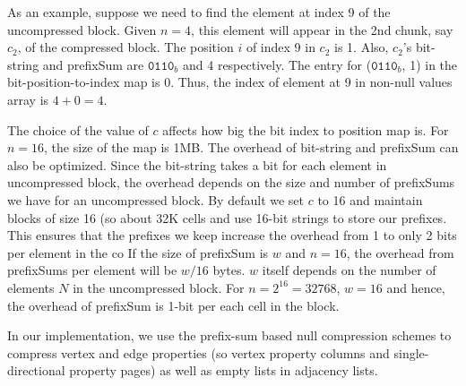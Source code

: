 As an example, suppose we need to find the element at index 9 of the uncompressed block. Given $n=4$, this element will appear in the 2nd chunk, say $c_2$, of the compressed block. The position $i$ of index 9 in $c_2$ is 1. Also, $c_2$'s bit-string and prefixSum are $\texttt{0110}_b$ and 4 respectively. The entry for ($\texttt{0110}_b$, 1) in the bit-position-to-index map is 0. Thus, the index of element at 9 in non-null values array is $4+0 = 4$.

The choice of the value of $c$ affects how big the bit index to position map is. For $n = 16$, the size of the map is 1MB. The overhead of bit-string and prefixSum can also be optimized. Since the bit-string takes a bit for each element in uncompressed block, the overhead depends on the size and number of prefixSums we have for an uncompressed block. By default we set $c$ to 16 and maintain blocks of size 16 (so about 32K cells and use 16-bit strings to store our prefixes. This ensures that the prefixes we keep increase the overhead from 1 to only 2 bits per element in the co 
 If the size of prefixSum is $w$ and $n=16$, the overhead from prefixSums per element will be $w/16$ bytes. $w$ itself depends on the number of elements $N$ in the uncompressed block. For $n=2^{16}=32768$, $w=16$ and hence, the overhead of prefixSum is 1-bit per each cell in the block.

In our implementation, we use the prefix-sum based null compression schemes to compress vertex and edge properties (so vertex property columns and single-directional property pages) as well as empty lists in adjacency lists.  
















